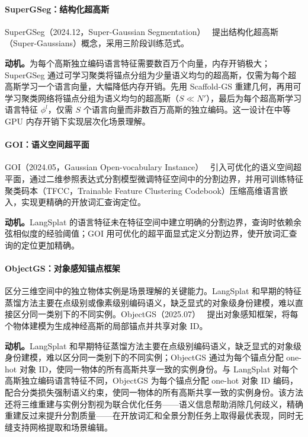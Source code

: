 \paragraph{SuperGSeg：结构化超高斯} SuperGSeg（2024.12，Super-Gaussian Segmentation）~\cite{2412_10231} 提出结构化超高斯（Super-Gaussians）概念，采用三阶段训练范式。

\textbf{动机。}为每个高斯独立编码语言特征需要数百万个向量，内存开销极大；SuperGSeg 通过可学习聚类将锚点分组为少量语义均匀的超高斯，仅需为每个超高斯学习一个语言向量，大幅降低内存开销。先用 Scaffold-GS 重建几何，再用可学习聚类网络将锚点分组为语义均匀的超高斯（$S \ll N'$），最后为每个超高斯学习语言特征 $\phi^l$，仅需 $S$ 个语言向量而非数百万高斯的独立编码。这一设计在中等 GPU 内存开销下实现层次化场景理解。

\paragraph{GOI：语义空间超平面} GOI（2024.05，Gaussian Open-vocabulary Instance）~\cite{2405_17596} 引入可优化的语义空间超平面，通过二维参照表达式分割模型微调特征空间中的分割边界，并用可训练特征聚类码本（TFCC，Trainable Feature Clustering Codebook）压缩高维语言嵌入，实现更精确的开放词汇查询定位。

\textbf{动机。}LangSplat 的语言特征未在特征空间中建立明确的分割边界，查询时依赖余弦相似度的经验阈值；GOI 用可优化的超平面显式定义分割边界，使开放词汇查询的定位更加精确。

\paragraph{ObjectGS：对象感知锚点框架}

区分三维空间中的独立物体实例是场景理解的关键能力。LangSplat 和早期的特征蒸馏方法主要在点级别或像素级别编码语义，缺乏显式的对象级身份建模，难以直接区分同一类别下的不同实例。ObjectGS（2025.07）~\cite{2507_15454} 提出对象感知框架，将每个物体建模为生成神经高斯的局部锚点并共享对象 ID。

\textbf{动机。}LangSplat 和早期特征蒸馏方法主要在点级别编码语义，缺乏显式的对象级身份建模，难以区分同一类别下的不同实例；ObjectGS 通过为每个锚点分配 one-hot 对象 ID，使同一物体的所有高斯共享一致的实例身份。与 LangSplat 对每个高斯独立编码语言特征不同，ObjectGS 为每个锚点分配 one-hot 对象 ID 编码，配合分类损失强制语义约束，使同一物体的所有高斯共享一致的实例身份。该方法还将三维重建与实例分割视为联合优化任务——语义信息帮助消除几何歧义，精确重建反过来提升分割质量——在开放词汇和全景分割任务上取得最优表现，同时无缝支持网格提取和场景编辑。

